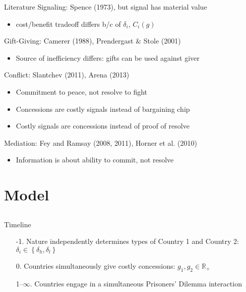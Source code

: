 \documentclass[handout]{beamer}
\newcommand{\de}{\delta}
\begin{document}
\begin{frame}{Literature}
\pause
Signaling: Spence (1973), but signal has material value
\pause
		\begin{itemize}
			\item cost/benefit tradeoff differs b/c of $\de_i$, $C_i(g)$
		\end{itemize} 

\pause
Gift-Giving: Camerer (1988), Prendergast $\&$ Stole (2001)
\pause
		\begin{itemize}
			\item Source of inefficiency differs: gifts can be used against giver
		\end{itemize} 

\pause
Conflict: Slantchev (2011), Arena (2013)
\pause
		\begin{itemize}[<+->]
			\item Commitment to peace, not resolve to fight
			\item Concessions are costly signals instead of bargaining chip
			\item Costly signals are concessions instead of proof of resolve
		\end{itemize} 

\pause
Mediation: Fey and Ramsay (2008, 2011), Horner et al. (2010)
\pause
		\begin{itemize}
			\item Information is about ability to commit, not resolve
		\end{itemize} 


\end{frame}



\section{Model}
\subsection{}
\begin{frame}{Timeline}
\pause
\begin{enumerate}[<+->]
	\item[-1.] Nature independently determines types of Country 1 and Country 2: $\de_i \in \left\{\de_h,\de_l\right\}$
	\item[0.] Countries simultaneously give costly concessions: $g_1, g_2 \in \mathbb{R}_+$
	\item[1--$\infty$.] Countries engage in a simultaneous Prisoners' Dilemma interaction 
\end{enumerate}

\end{frame}
\end{document}
